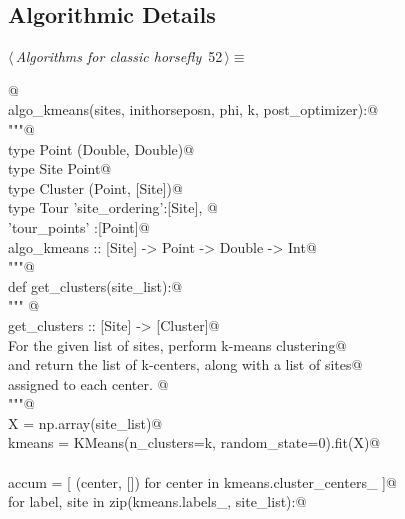 \documentclass[11.5pt]{report}
\begin{document}
\subsection{Algorithmic Details}
\newchunk
\begin{flushleft} \small\label{scrap77}\raggedright\small
{} $\langle\,${\itshape Algorithms for classic horsefly}\nobreak\ {\footnotesize {52}}$\,\rangle\equiv$
\vspace{-1ex}
\begin{list}{}{} \item
\mbox{}\verb@   @\\
\mbox{}\verb@def algo_kmeans(sites, inithorseposn, phi, k, post_optimizer):@\\
\mbox{}\verb@     """@\\
\mbox{}\verb@     type Point   (Double, Double)@\\
\mbox{}\verb@     type Site    Point@\\
\mbox{}\verb@     type Cluster (Point, [Site])@\\
\mbox{}\verb@     type Tour    {'site_ordering':[Site], @\\
\mbox{}\verb@                   'tour_points'  :[Point]}@\\
\mbox{}\verb@     algo_kmeans :: [Site] -> Point -> Double -> Int@\\
\mbox{}\verb@     """@\\
\mbox{}\verb@     def get_clusters(site_list):@\\
\mbox{}\verb@           """ @\\
\mbox{}\verb@           get_clusters :: [Site] -> [Cluster]@\\
\mbox{}\verb@           For the given list of sites, perform k-means clustering@\\
\mbox{}\verb@           and return the list of k-centers, along with a list of sites@\\
\mbox{}\verb@           assigned to each center. @\\
\mbox{}\verb@           """@\\
\mbox{}\verb@           X      = np.array(site_list)@\\
\mbox{}\verb@           kmeans = KMeans(n_clusters=k, random_state=0).fit(X)@\\
\mbox{}\verb@@\\
\mbox{}\verb@           accum = [ (center, [])  for center in kmeans.cluster_centers_ ]@\\
\mbox{}\verb@           for label, site in zip(kmeans.labels_, site_list):@\\

\end{list}
\end{flushleft}
\end{document}
